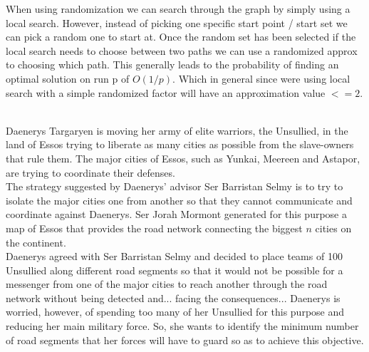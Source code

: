 \documentclass{article}
\begin{document}
\begin{enumerate}
\begin{adjustwidth}{1.8em}{0pt}
When using randomization we can search through the graph by simply using a local search. However, instead of picking one specific start point / start set we can pick a random one to start at. Once the random set has been selected if the local search needs to choose between two paths we can use a randomized approx to choosing which path. This generally leads to the probability of finding an optimal solution on run p of $O(1/p)$. Which in general since were using local search with a simple randomized factor will have an approximation value $<= 2$.
\end{adjustwidth}
\vspace{0.1in}

\end{enumerate}

\\

 Daenerys Targaryen is moving
her army of elite warriors, the Unsullied, in the land of Essos trying
to liberate as many cities as possible from the slave-owners that rule
them. The major cities of Essos, such as Yunkai, Meereen and Astapor,
are trying to coordinate their defenses.\\

\noindent The strategy suggested by Daenerys' advisor Ser Barristan
Selmy is to try to isolate the major cities one from another so that
they cannot communicate and coordinate against Daenerys. Ser Jorah
Mormont generated for this purpose a map of Essos that provides the
road network connecting the biggest $n$ cities on the continent.\\

\noindent Daenerys agreed with Ser Barristan Selmy and decided to
place teams of 100 Unsullied along different road segments so that it
would not be possible for a messenger from one of the major cities to
reach another through the road network without being detected
and... facing the consequences...  Daenerys is worried, however, of
spending too many of her Unsullied for this purpose and reducing her
main military force. So, she wants to identify the minimum number of
road segments that her forces will have to guard so as to achieve this
objective.\\
\end{document}
